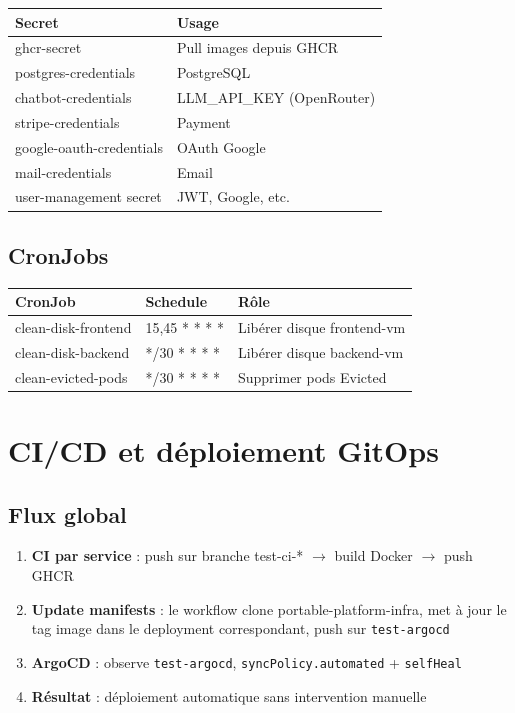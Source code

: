 \documentclass[11pt,a4paper]{article}
\begin{document}
\begin{center}
\begin{tabular}{@{}ll@{}}
\toprule
\textbf{Secret} & \textbf{Usage} \\
\midrule
ghcr-secret & Pull images depuis GHCR \\
postgres-credentials & PostgreSQL \\
chatbot-credentials & LLM\_API\_KEY (OpenRouter) \\
stripe-credentials & Payment \\
google-oauth-credentials & OAuth Google \\
mail-credentials & Email \\
user-management secret & JWT, Google, etc. \\
\bottomrule
\end{tabular}
\end{center}

\subsection{CronJobs}

\begin{center}
\begin{tabular}{@{}lll@{}}
\toprule
\textbf{CronJob} & \textbf{Schedule} & \textbf{Rôle} \\
\midrule
clean-disk-frontend  & 15,45 * * * * & Libérer disque frontend-vm \\
clean-disk-backend  & */30 * * * *  & Libérer disque backend-vm \\
clean-evicted-pods  & */30 * * * *  & Supprimer pods Evicted \\
\bottomrule
\end{tabular}
\end{center}

\section{CI/CD et déploiement GitOps}

\subsection{Flux global}

\begin{enumerate}
  \item \textbf{CI par service} : push sur branche test-ci-* $\rightarrow$ build Docker $\rightarrow$ push GHCR
  \item \textbf{Update manifests} : le workflow clone portable-platform-infra, met à jour le tag image dans le deployment correspondant, push sur \texttt{test-argocd}
  \item \textbf{ArgoCD} : observe \texttt{test-argocd}, \texttt{syncPolicy.automated} + \texttt{selfHeal}
  \item \textbf{Résultat} : déploiement automatique sans intervention manuelle
\end{enumerate}
\end{document}
